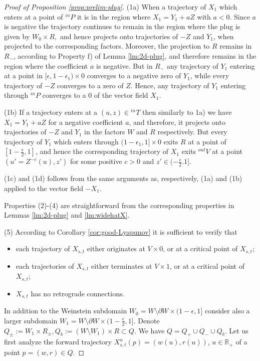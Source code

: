 \documentclass[12pt]{amsart}
\theoremstyle{plain}
\theoremstyle{definition}
\theoremstyle{remark}
\newcommand{\R}{\mathbb{R}}
\newcommand{\eps}{\epsilon}
\newcommand{\p}{\partial}
\begin{document}
\begin{proof}[Proof of Proposition \ref{prop:prelim-plug}]
(1a) When a   trajectory  of $X_1$ which enters at a point of  $ {}^{in}P$ it is in  the region where  $X_1=Y_1 + a Z$ with $a<0$. Since $a$ is negative the trajectory continues to remain in the region where the plug is given by $ W_0\times R,$  and hence projects onto trajectories of $-Z$ and $Y_1$, when projected to the corresponding factors. Moreover, the projection to $R$ remains in $R_-$, according to Property f) of Lemma \ref{lm:2d-plug}, 
 and therefore remains  in the region where the coefficient $a$ is negative.
 But in $R_-$ any trajectory of $Y_1$ entering at a point in $[\eps,1-\eps_1)\times 0$ converges to a negative  zero of $Y_1$, while every trajectory of $-Z$ converges to a zero of $Z$. Hence, any trajectory of $Y_1$ 
 entering through $ {}^{in}P$ converges to a $0$ of the vector field $X_1$.
 \medskip
 
 (1b)
  If a trajectory enters  at a  $(u, z)\in{}^{in}T  $ then similarly to 1a) we have  $X_1=Y_1+aZ$ for a negative coefficient $a$, and therefore, it projects    onto trajectories of $-Z$ and $Y_1$ in the factors $W$ and $R$ respectively. But every trajectory of $Y_1$ which enters through $(1-\eps_1,1]\times 0$ exits $R$ at a point of $[1-\frac\eps2,1]$, and hence the corresponding trajectory of $X_1$ exits ${}^{out}V$ at a point $(u'=Z^{-c}(u), z')$ for some positive $c>0$ and $z'\in(-\frac\eps2.1]$.
  \medskip
  
 (1c) and (1d) follows from the same arguments as, respectively, (1a) and (1b) applied to the vector field $-X_1$.
 
 \medskip
 Properties (2)-(4) are straightforward from the corresponding properties in Lemmas \ref{lm:2d-plug} and  \ref{lm:widehatX}.
 
(5) According to  Corollary \ref{cor:good-Lyapunov} it is sufficient to verify that
\begin{itemize}
\item each trajectory of $X_{s,t}$  either originates at $V\times 0$, or at a critical point of $X_{s,t}$;
\item  each trajectories of $X_{s,t}$  either terminates at $V\times 1$, or at a critical point of $X_{s,t}$;
\item $X_{s,t}$ has no retrograde connections.
\end{itemize}
In addition to the Weinstein subdomain $W_0=W\setminus\p W\times(1-\eps,1]$ consider also a larger subdomain  $W_1=W\setminus\p W\times(1-\frac\eps2,1]$.
Denote $Q_\pm:=W_1\times R_\pm,  Q_b:=(W\setminus W_1)\times R\subset Q.$  We have $Q=Q_+\cup Q_-\cup Q_b$.
Let us first analyze  the forward trajectory $X_{s,t}^u(p)=(w(u),r(u))$, $u\in\R_+$ of a  point 
 $p=(w,r)\in Q$. 
 

\end{proof}
\end{document}
